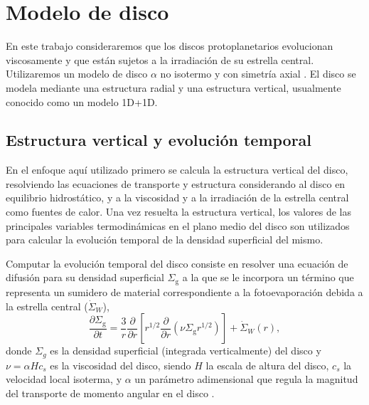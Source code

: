 \documentclass[baaa]{baaa}
\begin{document}
\vspace{-.25 cm}

\section{Modelo de disco}

En este trabajo consideraremos que los discos protoplanetarios evolucionan viscosamente y que están sujetos a la irradiación de su estrella central. Utilizaremos un modelo de disco $\alpha$ \citep{shakura1973black} no isotermo y con simetría axial \citep[ver][para los detalles del modelo]{OctavioMarcelo2017Codigo, OGuilera2019MNRASb}. El disco se modela mediante una estructura radial y una estructura vertical, usualmente conocido como un modelo 1D+1D.


\subsection{Estructura vertical y evolución temporal}

En el enfoque aquí utilizado primero se calcula la estructura vertical del disco, resolviendo las ecuaciones de transporte y estructura considerando al disco en equilibrio hidrostático, y a la viscosidad y a la irradiación de la estrella central como fuentes de calor. Una vez resuelta la estructura vertical, los valores de las principales variables termodinámicas en el plano medio del disco son utilizados para calcular la evolución temporal de la densidad superficial del mismo. 


Computar la evolución temporal del disco consiste en resolver una ecuación de difusión para su densidad superficial $\Sigma_{\text{g}}$ \citep[v.g][]{pringle1981accretion} a la que se le incorpora un término que representa un sumidero de material correspondiente a la fotoevaporaci\'on debida a la estrella central ($\dot{\Sigma}_W $),
\begin{equation} 
  \frac{\partial \Sigma_{\text{g}}} {\partial t}= \frac{3}{r}\frac{\partial}{\partial r} \left[ r^{1/2} \frac{\partial}{\partial r} \left( \nu \Sigma_{\text{g}} r^{1/2}  \right) \right] + \dot{\Sigma}_W (r),
\label{eq:disk_evol}
\end{equation}
donde $\Sigma_g$ es la densidad superficial (integrada verticalmente) del disco y $\nu = \alpha H c_{s}$ es la viscosidad del disco, siendo $H$ la escala de altura del disco, $c_{s}$ la velocidad local isoterma, y $\alpha$ un par\'ametro adimensional que regula la magnitud del transporte de momento angular en el disco \citep{shakura1973black}.
\end{document}
